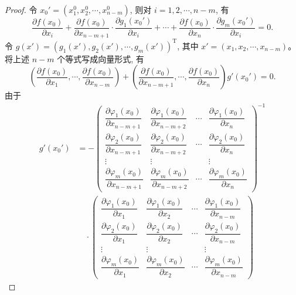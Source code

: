 \begin{proof}
令 $x_0'=(x_1^0,x_2^0,\cdots,x_{n-m}^0)$, 则对 $i=1,2,\cdots,n-m$, 有
\[
  \frac{\partial f(x_0)}{\partial x_i}
  +\frac{\partial f(x_0)}{\partial x_{n-m+1}}\cdot
  \frac{\partial g_1(x_0')}{\partial x_i}
  +\cdots+
  \frac{\partial f(x_0)}{\partial x_n}\cdot
  \frac{\partial g_m(x_0')}{\partial x_i}
  =0.
\]
令 $g(x')=(g_1(x'),g_2(x'),\cdots,g_m(x'))^{\mathrm T}$, 其中 $x'=(x_1,x_2,\cdots,x_{n-m})$。将上述 $n-m$ 个等式写成向量形式, 有
\begin{equation}
  \left(
    \frac{\partial f(x_0)}{\partial x_1},
    \cdots,
    \frac{\partial f(x_0)}{\partial x_{n-m}}
  \right)
  +
  \left(
    \frac{\partial f(x_0)}{\partial x_{n-m+1}},
    \cdots,
    \frac{\partial f(x_0)}{\partial x_n}
  \right)
  g'(x_0')=0.
  \label{eq:ma-14-5-4}
\end{equation}
由于
\begin{equation}
\begin{aligned}
  g'(x_0')
  &=
  -
  \begin{pmatrix}
    \dfrac{\partial\varphi_1(x_0)}{\partial x_{n-m+1}} &
    \dfrac{\partial\varphi_1(x_0)}{\partial x_{n-m+2}} &
    \cdots &
    \dfrac{\partial\varphi_1(x_0)}{\partial x_n}\\
    \dfrac{\partial\varphi_2(x_0)}{\partial x_{n-m+1}} &
    \dfrac{\partial\varphi_2(x_0)}{\partial x_{n-m+2}} &
    \cdots &
    \dfrac{\partial\varphi_2(x_0)}{\partial x_n}\\
    \vdots & \vdots & & \vdots\\
    \dfrac{\partial\varphi_m(x_0)}{\partial x_{n-m+1}} &
    \dfrac{\partial\varphi_m(x_0)}{\partial x_{n-m+2}} &
    \cdots &
    \dfrac{\partial\varphi_m(x_0)}{\partial x_n}
  \end{pmatrix}^{-1}\\
  &\quad\cdot
  \begin{pmatrix}
    \dfrac{\partial\varphi_1(x_0)}{\partial x_1} &
    \dfrac{\partial\varphi_1(x_0)}{\partial x_2} &
    \cdots &
    \dfrac{\partial\varphi_1(x_0)}{\partial x_{n-m}}\\
    \dfrac{\partial\varphi_2(x_0)}{\partial x_1} &
    \dfrac{\partial\varphi_2(x_0)}{\partial x_2} &
    \cdots &
    \dfrac{\partial\varphi_2(x_0)}{\partial x_{n-m}}\\
    \vdots & \vdots & & \vdots\\
    \dfrac{\partial\varphi_m(x_0)}{\partial x_1} &
    \dfrac{\partial\varphi_m(x_0)}{\partial x_2} &
    \cdots &
    \dfrac{\partial\varphi_m(x_0)}{\partial x_{n-m}}
  \end{pmatrix}

\end{aligned}
\end{equation}
\end{proof}
